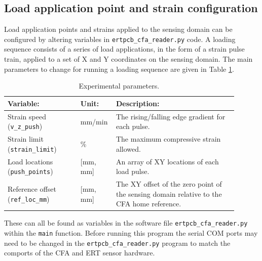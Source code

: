 \subsection{Load application point and strain configuration}
Load application points and strains applied to the sensing domain can be configured by altering variables in \verb|ertpcb_cfa_reader.py| code. A loading sequence consists of a series of load applications, in the form of a strain pulse train, applied to a set of X and Y coordinates on the sensing domain. The main parameters to change for running a loading sequence are given in Table \ref{tab:ert_cfa_params}.
\begin{table}[H]
	\caption{Experimental parameters.}
	\label{tab:ert_cfa_params}
	\begin{tabular}{|p{0.3\linewidth}|p{0.1\linewidth}|p{0.5\linewidth}|}
		\hline
		\textbf{Variable:}  & \textbf{Unit:} & \textbf{Description:} \\ \hline
		Strain speed (\texttt{v\_z\_push}) & mm/min & The rising/falling edge gradient for each pulse. \\ \hline
		Strain limit (\texttt{strain\_limit}) & \% & The maximum compressive strain allowed. \\ \hline
		Load locations (\texttt{push\_points}) & [mm, mm] & An array of XY locations of each load pulse. \\ \hline
		Reference offset (\texttt{ref\_loc\_mm}) & [mm, mm] & The XY offset of the zero point of the sensing domain relative to the CFA home reference. \\ \hline
	\end{tabular}
\end{table}
These can all be found as variables in the software file \verb|ertpcb_cfa_reader.py| within the \verb|main| function. Before running this program the serial COM ports may need to be changed in the \verb|ertpcb_cfa_reader.py| program to match the comports of the CFA and ERT sensor hardware.

